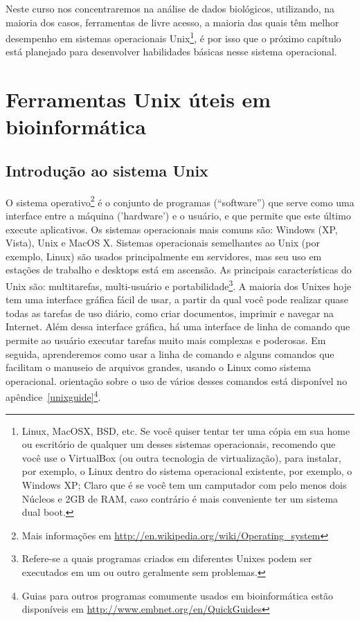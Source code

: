 \documentclass[letter,11pt]{book}
\begin{document}
Neste curso nos concentraremos na análise de dados biológicos, utilizando, na maioria dos casos, ferramentas de livre acesso, a maioria das quais têm melhor desempenho em sistemas operacionais Unix\footnote{Linux, MacOSX, BSD, etc. Se você quiser tentar ter uma cópia em sua home ou escritório de qualquer um desses sistemas operacionais, recomendo que você use o VirtualBox (ou outra tecnologia de virtualização), para instalar, por exemplo, o Linux dentro do sistema operacional existente, por exemplo, o Windows XP; Claro que é se você tem um camputador com pelo menos dois Núcleos e 2GB de RAM, caso contrário é mais conveniente ter um sistema dual boot.}, é por isso que o próximo capítulo está planejado para desenvolver habilidades básicas nesse sistema operacional.

\chapter{Ferramentas Unix úteis em bioinformática}
\section{Introdução ao sistema Unix}

O sistema operativo\footnote{Mais informações em \url{http://en.wikipedia.org/wiki/Operating_system}} é o conjunto de programas (``software'') que serve como uma interface entre a máquina ('hardware') e o usuário, e que permite que este último execute aplicativos. Os sistemas operacionais mais comuns são: Windows (XP, Vista), Unix e MacOS X. Sistemas operacionais semelhantes ao Unix (por exemplo, Linux) são usados principalmente em servidores, mas seu uso em estações de trabalho e desktops está em ascensão.  As principais características do Unix são: multitarefas, multi-usuário e portabilidade\footnote{Refere-se a quais programas criados em diferentes Unixes podem ser executados em um ou outro geralmente sem problemas.}. A maioria dos Unixes hoje tem uma interface gráfica fácil de usar, a partir da qual você pode realizar quase todas as tarefas de uso diário, como criar documentos, imprimir e navegar na Internet. Além dessa interface gráfica, há uma interface de linha de comando que permite ao usuário executar tarefas muito mais complexas e poderosas. Em seguida, aprenderemos como usar a linha de comando e alguns comandos que facilitam o manuseio de arquivos grandes, usando o Linux como sistema operacional. orientação sobre o uso de vários desses comandos está disponível no apêndice~\ref{unixguide}\footnote{Guias para outros programas comumente usados em bioinformática estão disponíveis em \url{http://www.embnet.org/en/QuickGuides}}.
\end{document}
